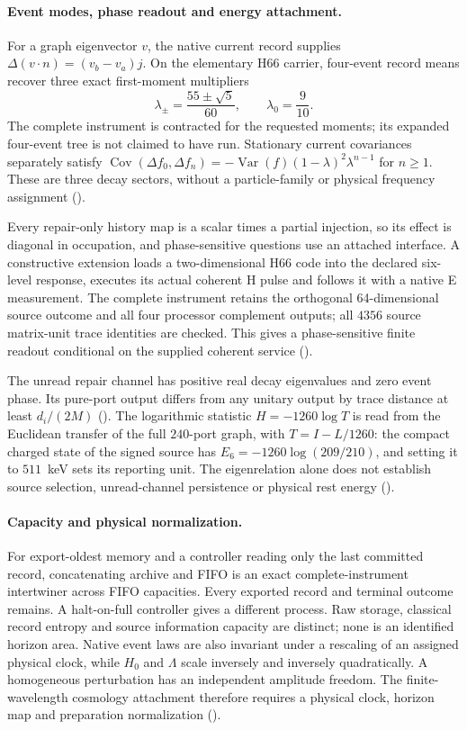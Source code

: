 \paragraph{Event modes, phase readout and energy attachment.}
For a graph eigenvector $v$, the native current record supplies
$\Delta(v\cdot n)=(v_b-v_a)j$. On the elementary H66 carrier, four-event
record means recover three exact first-moment multipliers
\[
 \lambda_\pm=\frac{55\pm\sqrt5}{60},\qquad\lambda_0=\frac9{10}.
\]
The complete instrument is contracted for the requested moments; its
expanded four-event tree is not claimed to have run. Stationary current
covariances separately satisfy
$\operatorname{Cov}(\Delta f_0,\Delta f_n)
=-\operatorname{Var}(f)(1-\lambda)^2\lambda^{n-1}$ for $n\ge1$.
These are three decay sectors, without a particle-family or physical
frequency assignment ().

Every repair-only history map is a scalar times a partial injection, so
its effect is diagonal in occupation, and phase-sensitive questions use an
attached interface. A constructive extension loads a
two-dimensional H66 code into the declared six-level response, executes
its actual coherent H pulse and follows it with a native E measurement.
The complete instrument retains the orthogonal 64-dimensional source
outcome and all four processor complement outputs; all $4356$ source
matrix-unit trace identities are checked. This gives a phase-sensitive
finite readout conditional on the supplied coherent service
().

The unread repair channel has positive real decay eigenvalues and zero
event phase. Its pure-port output differs from any unitary output by trace
distance at least $d_i/(2M)$ ().
The logarithmic statistic $H=-1260\log T$ is read from the Euclidean transfer of the
full $240$-port graph, with $T=I-L/1260$: the compact charged state of the
signed source has $E_6=-1260\log(209/210)$, and setting it to $511$~keV
sets its reporting unit. The eigenrelation alone does not establish source
selection, unread-channel persistence or physical rest energy
().

\paragraph{Capacity and physical normalization.}
For export-oldest memory and a controller reading only the last committed
record, concatenating archive and FIFO is an exact complete-instrument
intertwiner across FIFO capacities. Every exported record and terminal
outcome remains. A halt-on-full controller gives a different process.
Raw storage, classical record entropy and source information capacity are
distinct; none is an identified horizon area. Native event laws are also
invariant under a rescaling of an assigned physical clock, while $H_0$
and $\Lambda$ scale inversely and inversely quadratically. A homogeneous
perturbation has an independent amplitude freedom. The finite-wavelength
cosmology attachment therefore requires a physical clock, horizon map
and preparation normalization
().

